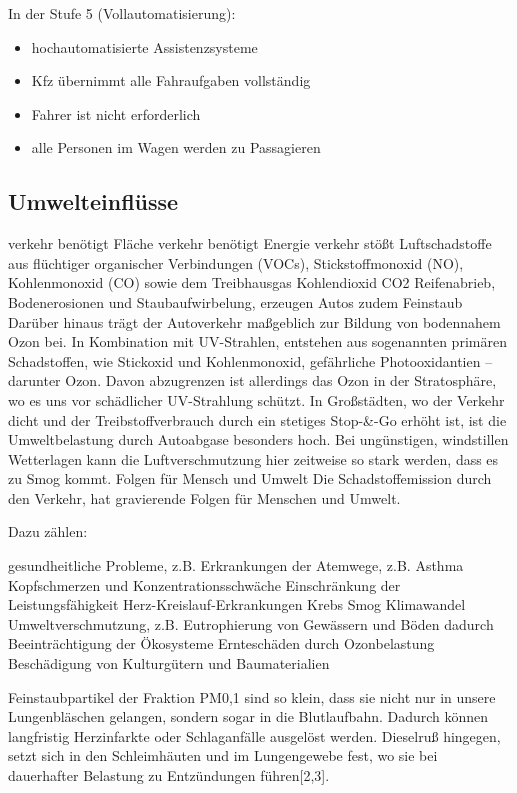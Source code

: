In der Stufe 5 (Vollautomatisierung):
\begin{itemize}
	\item hochautomatisierte Assistenzsysteme
	\item \ac{Kfz} übernimmt alle Fahraufgaben vollständig
	\item Fahrer ist nicht erforderlich
	\item alle Personen im Wagen werden zu Passagieren
\end{itemize}


\subsection{Umwelteinflüsse}

verkehr benötigt Fläche
verkehr benötigt Energie
verkehr stößt Luftschadstoffe aus
flüchtiger organischer Verbindungen (VOCs), Stickstoffmonoxid (NO), Kohlenmonoxid (CO) sowie dem Treibhausgas Kohlendioxid CO2
Reifenabrieb, Bodenerosionen und Staubaufwirbelung, erzeugen Autos zudem Feinstaub
Darüber hinaus trägt der Autoverkehr maßgeblich zur Bildung von bodennahem Ozon bei. In Kombination mit UV-Strahlen, entstehen aus sogenannten primären Schadstoffen, wie Stickoxid und Kohlenmonoxid, gefährliche Photooxidantien – darunter Ozon. Davon abzugrenzen ist allerdings das Ozon in der Stratosphäre, wo es uns vor schädlicher UV-Strahlung schützt.
In Großstädten, wo der Verkehr dicht und der Treibstoffverbrauch durch ein stetiges Stop-&-Go erhöht ist, ist die Umweltbelastung durch Autoabgase besonders hoch. Bei ungünstigen, windstillen Wetterlagen kann die Luftverschmutzung hier zeitweise so stark werden, dass es zu Smog kommt.
Folgen für Mensch und Umwelt
Die Schadstoffemission durch den Verkehr, hat gravierende Folgen für Menschen und Umwelt.

Dazu zählen:

gesundheitliche Probleme, z.B.
Erkrankungen der Atemwege, z.B. Asthma
Kopfschmerzen und Konzentrationsschwäche
Einschränkung der Leistungsfähigkeit
Herz-Kreislauf-Erkrankungen
Krebs
Smog
Klimawandel
Umweltverschmutzung, z.B. Eutrophierung von Gewässern und Böden
dadurch Beeinträchtigung der Ökosysteme
Ernteschäden durch Ozonbelastung
Beschädigung von Kulturgütern und Baumaterialien


Feinstaubpartikel der Fraktion PM0,1 sind so klein, dass sie nicht nur in unsere Lungenbläschen gelangen, sondern sogar in die Blutlaufbahn. Dadurch können langfristig Herzinfarkte oder Schlaganfälle ausgelöst werden. Dieselruß hingegen, setzt sich in den Schleimhäuten und im Lungengewebe fest, wo sie bei dauerhafter Belastung zu Entzündungen führen[2,3].

